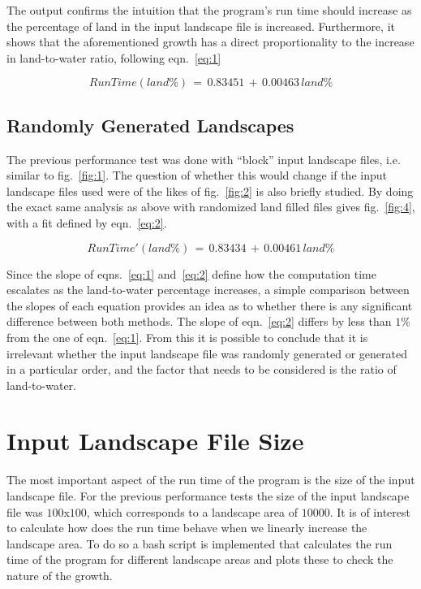 \documentclass[12pt,a4paper]{article}
\begin{document}
The output confirms the intuition that the program's run time should increase 
as the percentage of land in the input landscape file is increased. 
Furthermore, it shows that the aforementioned growth has a direct 
proportionality to the increase in land-to-water ratio, following 
eqn.~\ref{eq:1} 

\begin{equation}
RunTime(land\%)\,=\,0.83451\,+\,0.00463\,land\%
\label{eq:1}
\end{equation}

\subsection{Randomly Generated Landscapes}

The previous performance test was done with ``block'' input landscape files, 
i.e. similar to 
fig.~\ref{fig:1}. The question of whether this would change if the input 
landscape files used were of the likes of fig.~\ref{fig:2} is also briefly 
studied. By doing the exact same analysis as above with randomized land filled 
files gives fig.~\ref{fig:4}, with a fit defined by eqn.~\ref{eq:2}. 

\begin{equation}
RunTime'(land\%)\,=\,0.83434\,+\,0.00461\,land\%
\label{eq:2}
\end{equation}

Since the slope of eqns.~\ref{eq:1} and~\ref{eq:2} define how the computation 
time escalates as the land-to-water percentage increases, a simple comparison 
between the slopes of each equation provides an idea as to whether there is any 
significant difference between both methods. The slope 
of eqn.~\ref{eq:2} differs by less than $1\%$ from the one of eqn.~\ref{eq:1}.
From this it is possible to conclude that it is irrelevant whether the input 
landscape file was randomly generated or generated in a particular order, and 
the factor that needs to be considered is the ratio of land-to-water.

\section{Input Landscape File Size}

The most important aspect of the run time of the program is the size of the 
input landscape file. For the previous performance tests the size of the input 
landscape file was $100$x$100$, which corresponds to a landscape area of 
$10000$. It is of interest to calculate how does the run time behave when we 
linearly increase the landscape area. To do so a bash script is implemented 
that calculates the run time of the program for different landscape areas and 
plots these to check the nature of the growth.
\end{document}
